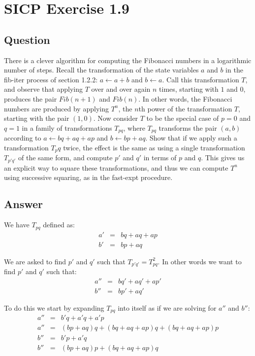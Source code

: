 \documentclass[a4paper,12pt]{article}
\begin{document}
\section*{SICP Exercise 1.9}

\subsection*{Question}
There is a clever algorithm for computing the Fibonacci numbers in a logarithmic 
number of steps. Recall the transformation of the state variables $a$ and $b$ in the fib-iter process of 
section 1.2.2: $a \leftarrow a + b$ and $b \leftarrow a$. Call this transformation $T$, and observe that applying $T$ over and over 
again $n$ times, starting with $1$ and $0$, produces the pair $Fib(n + 1)$ and $Fib(n)$. In other words, the 
Fibonacci numbers are produced by applying $T^n$, the $n$th power of the transformation $T$, starting with the 
pair $(1,0)$. Now consider $T$ to be the special case of $p = 0$ and $q = 1$ in a family of transformations $T_{pq}$, 
where $T_{pq}$ transforms the pair $(a,b)$ according to $a \leftarrow bq + aq + ap$ and $b \leftarrow bp + aq$. Show that if we 
apply such a transformation $T_pq$ twice, the effect is the same as using a single transformation $T_{p'q'}$ of the 
same form, and compute $p'$ and $q'$ in terms of $p$ and $q$. This gives us an explicit way to square these 
transformations, and thus we can compute $T^n$ using successive squaring, as in the fast-expt 
procedure.

\subsection*{Answer}

We have $T_{pq}$ defined as:
\begin{eqnarray*}
a' & = & bq + aq + ap \\
b' & = & bp + aq
\end{eqnarray*}

We are asked to find $p'$ and $q'$ such that $T_{p'q'} = T^2_{pq} $.  In other words we want to find $p'$ and $q'$ such that:
\begin{eqnarray}
a'' & = & bq' + aq' + ap' \\
b'' & = & bp' + aq'
\end{eqnarray}

To do this we start by expanding $T_{pq}$ into itself as if we are solving for $a''$ and $b''$:
\begin{eqnarray*}
a'' & = & b'q + a'q + a'p \\
a'' & = & (bp + aq)q + (bq + aq + ap)q + (bq + aq + ap)p \\
b'' & = & b'p + a'q \\
b'' & = & (bp + aq)p + (bq + aq + ap)q
\end{eqnarray*}
\end{document}
